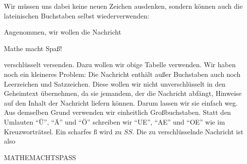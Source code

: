 \documentclass[a4paper,ngerman,12pt]{scrartcl}
\theoremstyle{definition}
\begin{document}
\begin{center}
\end{center}

Wir müssen uns dabei keine neuen Zeichen ausdenken, sondern können auch die lateinischen Buchstaben selbst wiederverwenden:

\begin{center}
\end{center}

Angenommen, wir wollen die Nachricht

\begin{center}
  Mathe macht Spaß!
\end{center}

verschlüsselt versenden. Dazu wollen wir obige Tabelle verwenden. Wir haben noch ein kleineres Problem: Die Nachricht enthält außer Buchstaben auch noch Leerzeichen und Satzzeichen. Diese wollen wir nicht unverschlüsselt in den Geheimtext übernehmen, da sie jemandem, der die Nachricht abfängt, Hinweise auf den Inhalt der Nachricht liefern können. Darum lassen wir sie einfach weg. Aus demselben Grund verwenden wir einheitlich Großbuchstaben. Statt den Umlauten "`Ü"', "`Ä"' und "`Ö"' schreiben wir "`UE"', "`AE"' und "`OE"' wie im Kreuzworträtsel. Ein scharfes $ß$ wird zu $SS$. Die zu verschlüsselnde Nachricht ist also

\begin{center}
  MATHEMACHTSPASS
\end{center}
\end{document}
